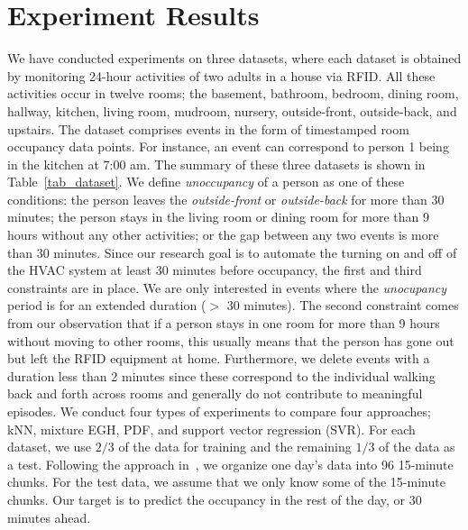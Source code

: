 \section{Experiment Results}
We have conducted experiments on three datasets, where each dataset is obtained by monitoring 24-hour activities of two adults in a house via RFID. 
All these activities occur in twelve rooms; the basement, bathroom, bedroom, dining room, hallway, kitchen, living room, mudroom, nursery, outside-front, outside-back, and upstairs.  
The dataset comprises events in the form of timestamped room occupancy data points. For instance, an event can correspond to person 1 being in the kitchen at 7:00 am. The summary of these three datasets is shown in Table~\ref{tab_dataset}.
We define \textit{unoccupancy} of a person as one of these conditions: the person leaves the {\em outside-front} or {\em outside-back} for more than 30 minutes; the person stays in the living room or dining room for more than 9 hours without any other activities; or the gap between any two events is more than 30 minutes. 
Since our research goal is to automate the turning on and off of the HVAC system at least 30 minutes before occupancy, the first and third constraints are in place. We are only interested in events where the {\em unocupancy} period is for an extended duration ($>$ 30 minutes). The second constraint comes from our observation that if a person stays in one room for more than 9 hours without moving to other rooms, 
this usually means that the person has gone out but left the RFID equipment at home. 
Furthermore, we delete events with a duration less than 
2 minutes since these correspond to the individual walking back and forth across rooms and generally do not contribute to meaningful episodes. We conduct four types of experiments to compare four approaches; 
kNN, mixture EGH, PDF, and support vector regression (SVR). 
For each dataset, we use $2/3$ of the data for training and the remaining $1/3$ of the data as a test. 
Following the approach in~\cite{scott2011preheat},
we organize one day's data into 96 15-minute chunks. 
For the test data, we assume that we only know some of the 15-minute chunks. Our target is to predict the occupancy in the rest of the day, or 30 minutes ahead. 

